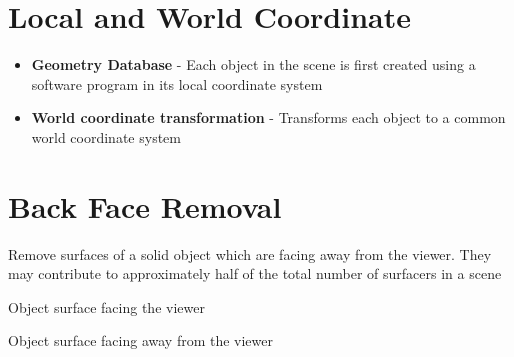 \documentclass{article}[18pt]
\begin{document}
\section{Local and World Coordinate}
\begin{itemize}
	\item \textbf{Geometry Database} - Each object in the scene is first created using a software program in its local coordinate system
	\item \textbf{World coordinate transformation} - Transforms each object to a common world coordinate system
\end{itemize}
\section{Back Face Removal}
Remove surfaces of a solid object which are facing away from the viewer. They may contribute to approximately half of the total number of surfacers in a scene
\begin{definition}
Object surface facing the viewer
\end{definition}
\begin{definition}
Object surface facing away from the viewer
\end{definition}
\end{document}
